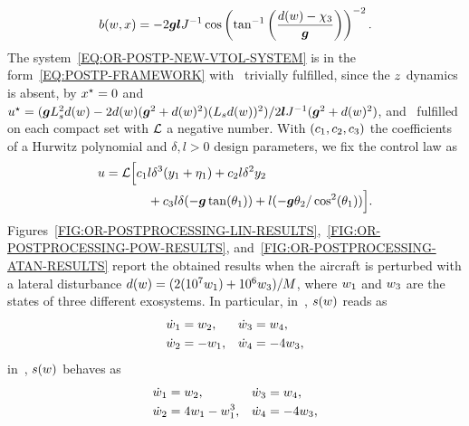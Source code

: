 \begin{equation*}
   b(w,x) = -2\boldsymbol{g}\boldsymbol{l}J^{-1} \cos\left( \tan^{-1}\left( \frac{d(w) - \chi_3}{\boldsymbol{g}}\right)\right)^{-2}.
\end{equation*}
The system~\eqref{EQ:OR-POSTP-NEW-VTOL-SYSTEM} is in the form~\eqref{EQ:POSTP-FRAMEWORK} with~ trivially fulfilled, since
the $z$ dynamics is absent, by $x^{\star} = 0$ and $u^{\star} = (\boldsymbol{g}L_s^2d(w) - 2d(w)(\boldsymbol{g}^2 + d(w)^2)(L_sd(w))^2)/2\boldsymbol{l}J^{-1}(\boldsymbol{g}^2 + d(w)^2)$,
and~ fulfilled on each compact set with $\mathcal{L}$ a negative number.
With $\left( c_1,c_2,c_3 \right)$ the coefficients of a Hurwitz polynomial and $\delta,l > 0$ design parameters, we fix the control law as
\begin{equation*}
   \begin{split}
      u = \mathcal{L}\Big[ c_1 & l \delta^3 (y_1 + \eta_1) + c_2  l \delta^2 y_2 \\ 
        & + c_3 l \delta (-\boldsymbol{g} \tan(\theta_1)) + l(-\boldsymbol{g} \theta_2 / \cos^2(\theta_1)) \Big].
   \end{split}
\end{equation*}
Figures~\ref{FIG:OR-POSTPROCESSING-LIN-RESULTS},~\ref{FIG:OR-POSTPROCESSING-POW-RESULTS}, and~\ref{FIG:OR-POSTPROCESSING-ATAN-RESULTS}
report the obtained results when the aircraft is perturbed with a lateral disturbance $d(w) = (2(10^7w_1) + 10^6w_3)/M$, where
$w_1$ and $w_3$ are the states of three different exosystems. In particular, in~, $s(w)$ reads as
\begin{equation}%
   \label{EQ:OR-POSTP-EXOSYSTEM-1}
   \begin{matrix}
      \begin{split}
         \dot{\ww}_1 & = \ww_2, \\
         \dot{\ww}_2 & = -\ww_1, \\
      \end{split} &
      \begin{split}
         \dot{\ww}_3 & = \ww_4, \\
         \dot{\ww}_4 & = -4\ww_3,
      \end{split}
   \end{matrix}
\end{equation}
in~, $s(w)$ behaves as
\begin{equation}%
   \label{EQ:OR-POSTP-EXOSYSTEM-2}
   \begin{matrix}
      \begin{split}
         \dot{\ww}_1 & = \ww_2, \\
         \dot{\ww}_2 & = 4\ww_1 - \ww_1^3, \\
      \end{split} &
      \begin{split}
         \dot{\ww}_3 & = \ww_4, \\
         \dot{\ww}_4 & = -4\ww_3,
      \end{split}
   \end{matrix}
\end{equation}
